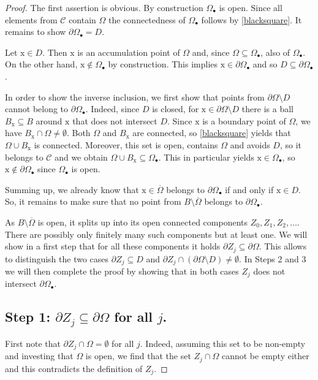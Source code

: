 \documentclass[10pt,leqno]{amsart}
\theoremstyle{definition}
\numberwithin{equation}{section}
\begin{document}
\begin{proof}
 The first assertion is obvious. By construction $\Omega_\bullet$ is open.
 Since all elements from $\mathcal C$ contain $\Omega$ the connectedness of
 $\Omega_\bullet$ follows by \eqref{blacksquare}. It
 remains to show $\partial \Omega_\bullet = D$.

 Let ${{\mathrm x}} \in D$. Then ${{\mathrm x}}$ is an accumulation point of $\Omega$
 and, since $\Omega \subseteq \Omega_\bullet$, also of $\Omega_\bullet$. On the
 other hand, ${{\mathrm x}} \not \in \Omega_\bullet$ by construction. This implies
 ${{\mathrm x}} \in \partial \Omega_\bullet$ and so $D \subseteq \partial
 \Omega_\bullet$.

 In order to show the inverse inclusion, we first show that points from
 $\partial \Omega \setminus D$ cannot belong to $\partial \Omega_\bullet$.
 Indeed, since $D$ is closed, for ${{\mathrm x}} \in \partial \Omega \setminus D$
 there is a ball $B_{{\mathrm x}} \subseteq B$ around ${{\mathrm x}}$ that does not
 intersect $D$. Since ${{\mathrm x}}$ is a boundary point of $\Omega$, we have
 $B_{{\mathrm x}} \cap \Omega \neq \emptyset$. Both $\Omega$ and $B_{{\mathrm x}}$ are
 connected, so \eqref{blacksquare} yields that $\Omega \cup B_{{\mathrm x}}$ is
 connected. Moreover, this set is open, contains $\Omega$ and avoids $D$, so it
 belongs to $\mathcal C$ and we obtain $\Omega \cup B_{{\mathrm x}} \subseteq
 \Omega_\bullet$. This in particular yields ${{\mathrm x}} \in \Omega_\bullet$,
 so ${{\mathrm x}} \notin \partial \Omega_\bullet$ since $\Omega_\bullet$ is open.

 Summing up, we already know that ${{\mathrm x}} \in \overline \Omega$
 belongs to $\partial \Omega_\bullet$ if and only if ${{\mathrm x}} \in D$. So, it
 remains to make sure that no point from $B \setminus \overline \Omega$ belongs
 to $\partial \Omega_\bullet$.

 As $B \setminus \overline{\Omega}$ is open, it splits up into its open
 connected components $Z_0, Z_1, Z_2, \ldots$. There are possibly only finitely
 many such components but at least one. We will show in a first step that for
 all these components it holds $\partial Z_j \subseteq \partial \Omega$. This
 allows to distinguish the two cases $\partial Z_j \subseteq D$ and $\partial
 Z_j \cap (\partial \Omega \setminus D) \neq \emptyset$. In Steps 2 and 3 we
 will then complete the proof by showing that in both cases $Z_j$ does not
intersect $\partial \Omega_\bullet$.

\subsection*{Step 1: $\partial Z_j \subseteq \partial \Omega$ for all
$j$.}
 First note that $\partial Z_j \cap \Omega = \emptyset$
 for all $j$. Indeed, assuming this set to be non-empty and investing that
 $\Omega$ is open, we find that the set $Z_j \cap \Omega$ cannot be empty
 either and this contradicts the definition of $Z_j$.
 

\end{proof}
\end{document}
